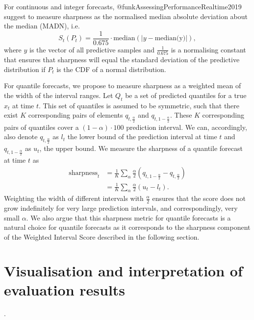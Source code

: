 \documentclass[article]{jss}
\begin{document}
For continuous and integer forecasts, @funkAssessingPerformanceRealtime2019 suggest to measure sharpness as the normalised median absolute deviation about the median (MADN), i.e. 
$$ S_t(P_t) = \frac{1}{0.675} \cdot \text{median}(|y - \text{median(y)}|), $$ 
where $y$ is the vector of all predictive samples and $\frac{1}{0.675}$ is a normalising constant that ensures that sharpness will equal the standard deviation of the predictive distribution if $P_t$ is the CDF of a normal distribution. 

For quantile forecasts, we propose to measure sharpness as a weighted mean of the width of the interval ranges. Let $Q_t$ be a set of predicted quantiles for a true $x_t$ at time $t$. This set of quantiles is assumed to be symmetric, such that there exist $K$ corresponding pairs of elements $q_{t, \frac{\alpha}{2}}$ and $q_{t, 1-\frac{\alpha}{2}}$. These $K$ corresponding pairs of quantiles cover a $(1 - \alpha) \cdot 100$ prediction interval. We can, accordingly, also denote $q_{t, \frac{\alpha}{2}}$ as $l_t$ the lower bound of the prediction interval at time $t$ and $q_{t, 1-\frac{\alpha}{2}}$ as $u_t$, the upper bound. We measure the sharpness of a quantile forecast at time $t$ as
\begin{align*}
\text{sharpness}_t &= \frac{1}{K} \sum_{\alpha} \frac{\alpha}{2} (q_{t, 1 - \frac{\alpha}{2}} - q_{t, \frac{\alpha}{2}}) \\
                   &= \frac{1}{K} \sum_{\alpha} \frac{\alpha}{2} (u_t - l_t).
\end{align*}
Weighting the width of different intervals with $\frac{\alpha}{2}$ ensures that the score does not grow indefinitely for very large prediction intervals, and correspondingly, very small $\alpha$. We also argue that this sharpness metric for quantile forecasts is a natural choice for quantile forecasts as it corresponds to the sharpness component of the Weighted Interval Score  described in the following section.


\section[visualisation]{Visualisation and interpretation of evaluation results}





\begin{CodeInput}
.
\end{CodeInput}
\end{document}
